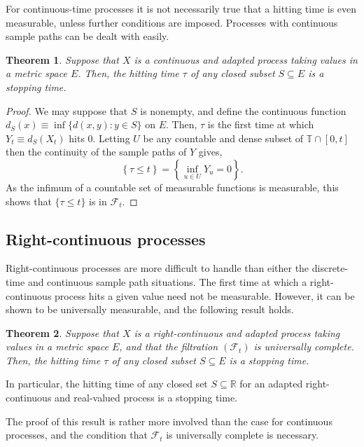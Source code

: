 \documentclass[12pt]{article}
\newtheorem*{theorem*}{Theorem}
\begin{document}
For continuous-time processes it is not necessarily true that a hitting time is even measurable, unless further conditions are imposed. Processes with continuous sample paths can be dealt with easily.

\begin{theorem*}
Suppose that $X$ is a continuous and adapted process taking values in a metric space $E$. Then, the hitting time $\tau$ of any closed subset $S\subseteq E$ is a stopping time.
\end{theorem*}
\begin{proof}
We may suppose that $S$ is nonempty, and define the continuous function $d_S(x)\equiv\inf\{d(x,y)\colon y\in S\}$ on $E$. Then, $\tau$ is the first time at which $Y_t\equiv d_S(X_t)$ hits $0$. Letting $U$ be any countable and dense subset of $\mathbb{T}\cap[0,t]$ then the continuity of the sample paths of $Y$ gives,
\begin{equation*}
\left\{\tau\le t\right\}=\left\{\inf_{u\in U}Y_u=0\right\}.
\end{equation*}
As the infimum of a countable set of measurable functions is measurable, this shows that $\{\tau\le t\}$ is in $\mathcal{F}_t$.
\end{proof}

\subsection*{Right-continuous processes}

Right-continuous processes are more difficult to handle than either the discrete-time and continuous sample path situations. The first time at which a right-continuous process hits a given value need not be measurable. However, it can be shown to be universally measurable, and the following result holds.

\begin{theorem*}
Suppose that $X$ is a right-continuous and adapted process taking values in a metric space $E$, and that the filtration $(\mathcal{F}_t)$ is universally complete. Then, the hitting time $\tau$ of any closed subset $S\subseteq E$ is a stopping time.
\end{theorem*}

In particular, the hitting time of any closed set $S\subseteq\mathbb{R}$ for an adapted right-continuous and real-valued process is a stopping time.

The proof of this result is rather more involved than the case for continuous processes, and the condition that $\mathcal{F}_t$ is universally complete is necessary.
\end{document}
